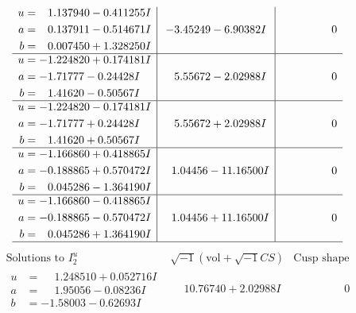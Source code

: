 \documentclass[1p]{elsarticle_modified}
\theoremstyle{definition}
\newcommand{\I}{\sqrt{-1}}
\begin{document}
$$\begin{array}{c|c|c}
\begin{aligned}
u &= \phantom{-}1.137940 - 0.411255 I \\
a &= \phantom{-}0.137911 - 0.514671 I \\
b &= \phantom{-}0.007450 + 1.328250 I\end{aligned}
 & -3.45249 - 6.90382 I & \phantom{-0.000000 } 0 \\ \hline\begin{aligned}
u &= -1.224820 + 0.174181 I \\
a &= -1.71777 - 0.24428 I \\
b &= \phantom{-}1.41620 - 0.50567 I\end{aligned}
 & \phantom{-}5.55672 - 2.02988 I & \phantom{-0.000000 } 0 \\ \hline\begin{aligned}
u &= -1.224820 - 0.174181 I \\
a &= -1.71777 + 0.24428 I \\
b &= \phantom{-}1.41620 + 0.50567 I\end{aligned}
 & \phantom{-}5.55672 + 2.02988 I & \phantom{-0.000000 } 0 \\ \hline\begin{aligned}
u &= -1.166860 + 0.418865 I \\
a &= -0.188865 + 0.570472 I \\
b &= \phantom{-}0.045286 - 1.364190 I\end{aligned}
 & \phantom{-}1.04456 - 11.16500 I & \phantom{-0.000000 } 0 \\ \hline\begin{aligned}
u &= -1.166860 - 0.418865 I \\
a &= -0.188865 - 0.570472 I \\
b &= \phantom{-}0.045286 + 1.364190 I\end{aligned}
 & \phantom{-}1.04456 + 11.16500 I & \phantom{-0.000000 } 0\\
 \hline 
 \end{array}$$\newpage$$\begin{array}{c|c|c}  
\text{Solutions to }I^u_{2}& \I (\text{vol} + \sqrt{-1}CS) & \text{Cusp shape}\\
 \hline 
\begin{aligned}
u &= \phantom{-}1.248510 + 0.052716 I \\
a &= \phantom{-}1.95056 - 0.08236 I \\
b &= -1.58003 - 0.62693 I\end{aligned}
 & \phantom{-}10.76740 + 2.02988 I & \phantom{-0.000000 } 0 \\ \hline\begin{aligned}

\end{aligned}
\end{array}$$
\end{document}
